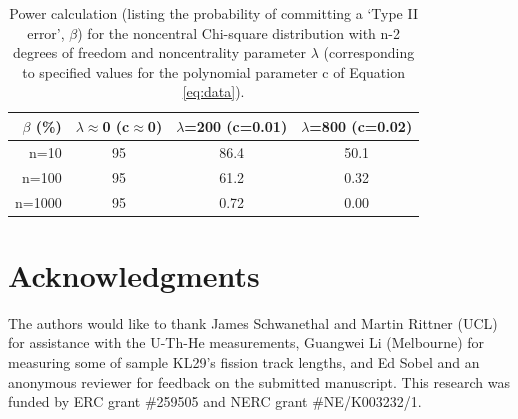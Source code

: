 \documentclass{article}
\begin{document}
\begin{table}[!ht]
\centering
\begin{tabular}{r|ccc}
$\beta$ (\%) & $\lambda\approx$0 (c$\approx$0) & $\lambda$=200 (c=0.01) & $\lambda$=800 (c=0.02) \\ \hline
n=10 &   95 &  86.4 &  50.1 \\
n=100 &   95 &  61.2 &   0.32 \\
n=1000 &   95 &   0.72 &   0.00
\end{tabular}
\caption{Power calculation (listing the probability of committing a
  `Type II error', $\beta$) for the noncentral Chi-square distribution
  with n-2 degrees of freedom and noncentrality parameter $\lambda$
  (corresponding to specified values for the polynomial parameter c of
  Equation \ref{eq:data}).}
\label{tab:power}
\end{table}

\section*{Acknowledgments}

The authors would like to thank James Schwanethal and Martin Rittner
(UCL) for assistance with the U-Th-He measurements, Guangwei Li
(Melbourne) for measuring some of sample KL29's fission track lengths,
and Ed Sobel and an anonymous reviewer for feedback on the submitted
manuscript. This research was funded by ERC grant \#259505 and NERC
grant \#NE/K003232/1.

%
%
\end{document}
